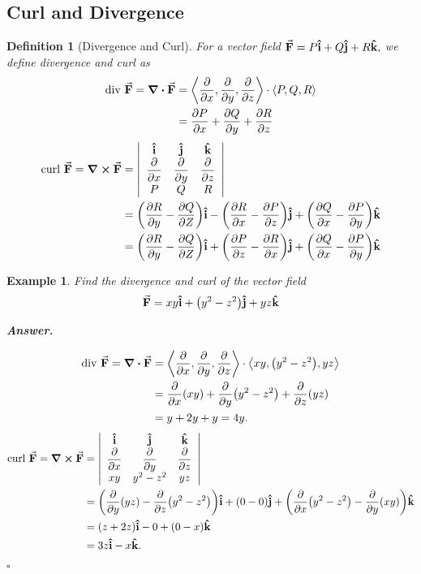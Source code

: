 \documentclass[12pt,a4paper]{article}
\newtheorem{df}{Definition}[subsection]
\newtheorem{eg}{Example}[subsection]
\newenvironment*{ans}{\par\indent\textbf{\textit{Answer. }}\par}{\par\hfill{$\square$}\par}
\def\dsst{\displaystyle}
\def\veci{\vu{\boldsymbol{\textbf{i}}}}
\def\vecj{\vu{\boldsymbol{\textbf{j}}}}
\def\veck{\vu{\boldsymbol{\textbf{k}}}}
\def\F{\va{\boldsymbol{\textbf{F}}}}
\def\Div{\text{div }}
\def\Curl{\text{curl }}
\begin{document}
\subsection{Curl and Divergence}
\begin{df}[Divergence and Curl]
	For a vector field $\F=P\veci+Q\vecj+R\veck,$ we define divergence and curl as \[\begin{aligned}\Div\F= \div\F&=\left\langle\pdv{}{x},\pdv{}{y},\pdv{}{z}\right\rangle \cdot\left\langle P,Q,R\right\rangle\\&=\pdv{P}{x}+\pdv{Q}{y}+\pdv{R}{z}\end{aligned}\]\[\begin{aligned}\Curl\F=\curl\F&=\qty|\begin{array}{ccc}\veci&\vecj&\veck\\\dsst\pdv{}{x}&\dsst\pdv{}{y}&\dsst\pdv{}{z}\\P&Q&R\end{array}|\\&=\qty(\pdv{R}{y}-\pdv{Q}{Z})\veci-\qty(\pdv{R}{x}-\pdv{P}{z})\vecj+\qty(\pdv{Q}{x}-\pdv{P}{y})\veck\\&=\qty(\pdv{R}{y}-\pdv{Q}{Z})\veci+\qty(\pdv{P}{z}-\pdv{R}{x})\vecj+\qty(\pdv{Q}{x}-\pdv{P}{y})\veck\end{aligned}\]
\end{df}
\begin{eg}
	Find the divergence and curl of the vector field \[\F=xy\veci+\qty(y^2-z^2)\vecj+yz\veck\]
	\begin{ans}	
		\[\begin{aligned}\Div\F=\div\F&=\left\langle\pdv{}{x},\pdv{}{y},\pdv{}{z}\right\rangle\cdot\left\langle xy,\qty(y^2-z^2),yz\right\rangle\\&=\pdv{}{x}\qty(xy)+\pdv{}{y}\qty(y^2-z^2)+\pdv{}{z}\qty(yz)\\&=y+2y+y=4y.\end{aligned}\]
		\[\begin{aligned}\Curl\F=\curl\F&=\qty|\begin{array}{ccc}\veci&\vecj&\veck\\\dsst\pdv{x}&\dsst\pdv{y}&\dsst\pdv{z}\\xy&y^2-z^2&yz\end{array}|\\&=\qty(\pdv{y}(yz)-\pdv{z}\qty(y^2-z^2))\veci+(0-0)\vecj+\qty(\pdv{x}\qty(y^2-z^2)-\pdv{y}(xy))\veck\\&=(z+2z)\veci-0+(0-x)\veck\\&=3z\veci-x\veck.\end{aligned}\]
	\end{ans}
\end{eg}
\end{document}
